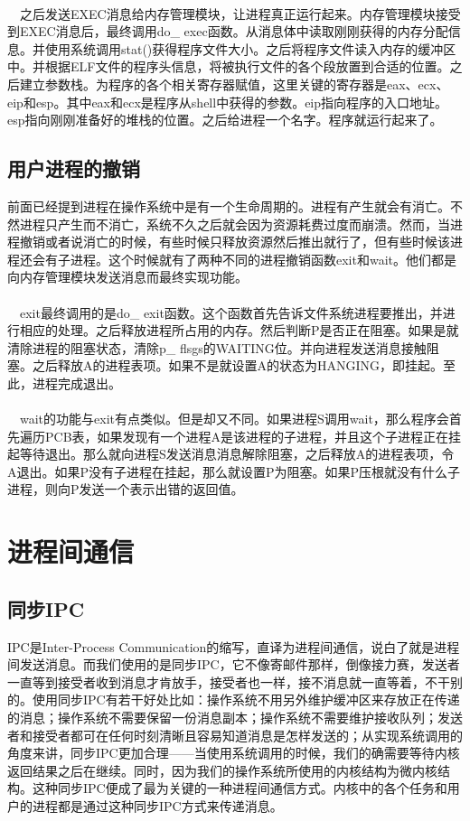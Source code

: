 \documentclass[UTF8,nofonts,cs4size]{ctexrep}
\begin{document}
\paragraph{}
\indent \ \ 之后发送EXEC消息给内存管理模块，让进程真正运行起来。内存管理模块接受到EXEC消息后，最终调用do\_ exec函数。从消息体中读取刚刚获得的内存分配信息。并使用系统调用stat()获得程序文件大小。之后将程序文件读入内存的缓冲区中。并根据ELF文件的程序头信息，将被执行文件的各个段放置到合适的位置。之后建立参数栈。为程序的各个相关寄存器赋值，这里关键的寄存器是eax、ecx、eip和esp。其中eax和ecx是程序从shell中获得的参数。eip指向程序的入口地址。esp指向刚刚准备好的堆栈的位置。之后给进程一个名字。程序就运行起来了。
\subsection{用户进程的撤销}
前面已经提到进程在操作系统中是有一个生命周期的。进程有产生就会有消亡。不然进程只产生而不消亡，系统不久之后就会因为资源耗费过度而崩溃。然而，当进程撤销或者说消亡的时候，有些时候只释放资源然后推出就行了，但有些时候该进程还会有子进程。这个时候就有了两种不同的进程撤销函数exit和wait。他们都是向内存管理模块发送消息而最终实现功能。
\paragraph{}
\indent \ \ 
exit最终调用的是do\_ exit函数。这个函数首先告诉文件系统进程要推出，并进行相应的处理。之后释放进程所占用的内存。然后判断P是否正在阻塞。如果是就清除进程的阻塞状态，清除p\_ flsgs的WAITING位。并向进程发送消息接触阻塞。之后释放A的进程表项。如果不是就设置A的状态为HANGING，即挂起。至此，进程完成退出。
\paragraph{}
\indent \ \ wait的功能与exit有点类似。但是却又不同。如果进程S调用wait，那么程序会首先遍历PCB表，如果发现有一个进程A是该进程的子进程，并且这个子进程正在挂起等待退出。那么就向进程S发送消息消息解除阻塞，之后释放A的进程表项，令A退出。如果P没有子进程在挂起，那么就设置P为阻塞。如果P压根就没有什么子进程，则向P发送一个表示出错的返回值。
\section{进程间通信}
\subsection{同步IPC}
IPC是Inter-Process Communication的缩写，直译为进程间通信，说白了就是进程间发送消息。而我们使用的是同步IPC，它不像寄邮件那样，倒像接力赛，发送者一直等到接受者收到消息才肯放手，接受者也一样，接不消息就一直等着，不干别的。使用同步IPC有若干好处比如：操作系统不用另外维护缓冲区来存放正在传递的消息；操作系统不需要保留一份消息副本；操作系统不需要维护接收队列；发送者和接受者都可在任何时刻清晰且容易知道消息是怎样发送的；从实现系统调用的角度来讲，同步IPC更加合理——当使用系统调用的时候，我们的确需要等待内核返回结果之后在继续。同时，因为我们的操作系统所使用的内核结构为微内核结构。这种同步IPC便成了最为关键的一种进程间通信方式。内核中的各个任务和用户的进程都是通过这种同步IPC方式来传递消息。
\end{document}
